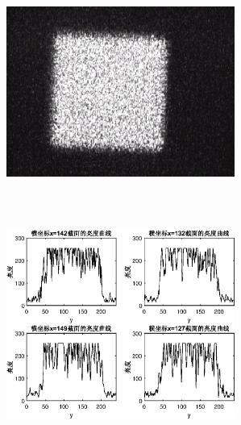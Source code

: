 \documentclass[UTF8]{ctexart}
\makeatletter
\newcommand{\figcaption}{\def\@captype{figure}\caption}
\makeatother
\begin{document}
\begin{center}
			\includegraphics[width=7.5cm,height=7.5cm]{YUANaddDOEmoveCCD26.eps}
			\includegraphics[width=7.5cm,height=7.5cm]{addDOEmoveCCD26.eps}
			\figcaption{加DOE的CCD捕捉图和光亮度曲线(CCD与DOE距离26cm)}\label{addDOEmoveCCD26}
			

\end{center}
\end{document}
